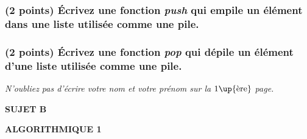 \documentclass[11pt,a4paper]{article}
\newcommand{\TitreMatiere}{Algorithmique 1}
\begin{document}
\medskip

\subsubsection{(2 points) \'Ecrivez une fonction \og \textit{push} \fg{} qui empile un élément dans une liste utilisée comme une pile. }

\begin{center}
\end{center}


\subsubsection{(2 points) \'Ecrivez une fonction \og \textit{pop} \fg{} qui dépile un élément d'une liste utilisée comme une pile. }

\begin{center}
\end{center}



\vfillFirst

\begin{center}
\textit{N'oubliez pas d'écrire votre nom et votre prénom sur la $1\up{\text{ère}}$ page.}
\end{center}

\vfillLast


\clearpage



\vfillFirst

\begin{center}

\begin{LARGE}
\textbf{SUJET B}

\bigskip

\textbf{\MakeUppercase{\TitreMatiere}}
\end{LARGE}

\end{center}

\vfillLast
\end{document}
